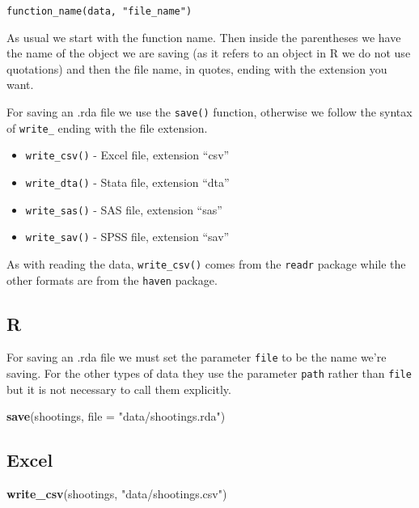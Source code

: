 \documentclass[
  12pt,
]{book}
\newenvironment{Shaded}{\begin{snugshade}}{\end{snugshade}}
\newcommand{\DataTypeTok}[1]{\textcolor[rgb]{0.13,0.29,0.53}{#1}}
\newcommand{\KeywordTok}[1]{\textcolor[rgb]{0.13,0.29,0.53}{\textbf{#1}}}
\newcommand{\NormalTok}[1]{#1}
\newcommand{\StringTok}[1]{\textcolor[rgb]{0.31,0.60,0.02}{#1}}
\providecommand{\tightlist}{%
  \setlength{\itemsep}{0pt}\setlength{\parskip}{0pt}}
\begin{document}
\texttt{function\_name(data,\ "file\_name")}

As usual we start with the function name. Then inside the parentheses we have the name of the object we are saving (as it refers to an object in R we do not use quotations) and then the file name, in quotes, ending with the extension you want.

For saving an .rda file we use the \texttt{save()} function, otherwise we follow the syntax of \texttt{write\_} ending with the file extension.

\begin{itemize}
\tightlist
\item
  \texttt{write\_csv()} - Excel file, extension ``csv''
\item
  \texttt{write\_dta()} - Stata file, extension ``dta''
\item
  \texttt{write\_sas()} - SAS file, extension ``sas''
\item
  \texttt{write\_sav()} - SPSS file, extension ``sav''
\end{itemize}

As with reading the data, \texttt{write\_csv()} comes from the \texttt{readr} package while the other formats are from the \texttt{haven} package.

\hypertarget{r-1}{%
\subsection{R}\label{r-1}}

For saving an .rda file we must set the parameter \texttt{file} to be the name we're saving. For the other types of data they use the parameter \texttt{path} rather than \texttt{file} but it is not necessary to call them explicitly.

\begin{Shaded}
\begin{Highlighting}[]
\KeywordTok{save}\NormalTok{(shootings, }\DataTypeTok{file =}  \StringTok{"data/shootings.rda"}\NormalTok{)}
\end{Highlighting}
\end{Shaded}

\hypertarget{excel-1}{%
\subsection{Excel}\label{excel-1}}

\begin{Shaded}
\begin{Highlighting}[]
\KeywordTok{write\_csv}\NormalTok{(shootings, }\StringTok{"data/shootings.csv"}\NormalTok{)}
\end{Highlighting}
\end{Shaded}
\end{document}
